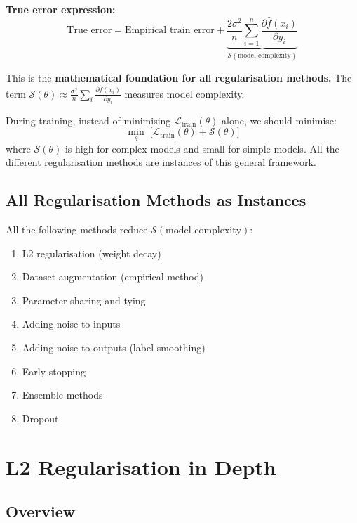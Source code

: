 \documentclass[12pt,a4paper]{article}
\newcommand{\Loss}{\mathcal{L}}
\newcommand{\Reg}{\mathcal{S}}
\begin{document}
\textbf{True error expression:}
\[
\boxed{
\text{True error}
= \text{Empirical train error}
+ \underbrace{\frac{2\sigma^2}{n}\sum_{i=1}^{n}\frac{\partial\hat{f}(x_i)}{\partial y_i}}_{\Reg(\text{model complexity})}
}
\]

\begin{keybox}
This is the \textbf{mathematical foundation for all regularisation methods.} The term $\Reg(\theta) \approx \frac{\sigma^2}{n}\sum_{i}\frac{\partial\hat{f}(x_i)}{\partial y_i}$ measures model complexity.

During training, instead of minimising $\Loss_{\text{train}}(\theta)$ alone, we should minimise:
\[
\min_{\theta}\;\bigl[\Loss_{\text{train}}(\theta) + \Reg(\theta)\bigr]
\]
where $\Reg(\theta)$ is high for complex models and small for simple models. All the different regularisation methods are instances of this general framework.
\end{keybox}

\subsection{All Regularisation Methods as Instances}

All the following methods reduce $\Reg(\text{model complexity})$:
\begin{enumerate}
  \item L2 regularisation (weight decay)
  \item Dataset augmentation (empirical method)
  \item Parameter sharing and tying
  \item Adding noise to inputs
  \item Adding noise to outputs (label smoothing)
  \item Early stopping
  \item Ensemble methods
  \item Dropout
\end{enumerate}

\section{L2 Regularisation in Depth}

\subsection{Overview}
\end{document}
